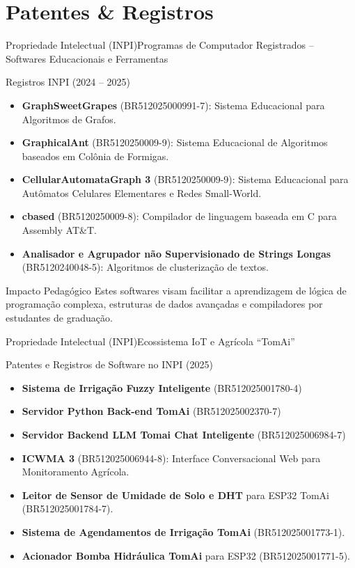 \documentclass[9pt]{beamer}
\begin{document}
\section{Patentes \& Registros}
\begin{frame}{Propriedade Intelectual (INPI)}{Programas de Computador Registrados -- Softwares Educacionais e Ferramentas}
  \begin{block}{Registros INPI (2024 -- 2025)}
    \begin{itemize}
      \item \textbf{GraphSweetGrapes} (BR512025000991-7): Sistema Educacional para Algoritmos de Grafos.
      \item \textbf{GraphicalAnt} (BR5120250009-9): Sistema Educacional de Algoritmos baseados em Colônia de Formigas.
      \item \textbf{CellularAutomataGraph 3} (BR5120250009-9): Sistema Educacional para Autômatos Celulares Elementares e Redes Small-World.
      \item \textbf{cbased} (BR5120250009-8): Compilador de linguagem baseada em C para Assembly AT\&T.
      \item \textbf{Analisador e Agrupador não Supervisionado de Strings Longas} (BR5120240048-5): Algoritmos de clusterização de textos.
    \end{itemize}
  \end{block}
  \pause
  \begin{exampleblock}{Impacto Pedagógico}
    Estes softwares visam facilitar a aprendizagem de lógica de programação complexa, estruturas de dados avançadas e compiladores por estudantes de graduação.
  \end{exampleblock}
\end{frame}

\begin{frame}{Propriedade Intelectual (INPI)}{Ecossistema IoT e Agrícola ``TomAi''}
  \begin{block}{Patentes e Registros de Software no INPI (2025)}
    \begin{itemize}
      \item \textbf{Sistema de Irrigação Fuzzy Inteligente} (BR512025001780-4)
      \item \textbf{Servidor Python Back-end TomAi} (BR512025002370-7)
      \item \textbf{Servidor Backend LLM Tomai Chat Inteligente} (BR512025006984-7)
      \item \textbf{ICWMA 3} (BR512025006944-8): Interface Conversacional Web para Monitoramento Agrícola.
      \item \textbf{Leitor de Sensor de Umidade de Solo e DHT} para ESP32 TomAi (BR512025001784-7).
      \item \textbf{Sistema de Agendamentos de Irrigação TomAi} (BR512025001773-1).
      \item \textbf{Acionador Bomba Hidráulica TomAi} para ESP32 (BR512025001771-5).
    \end{itemize}
  \end{block}
\end{frame}
\end{document}
